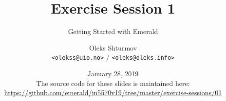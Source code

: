 \documentclass[xcolor=table]{beamer}
\title{{\Large Exercise Session 1}}
\subtitle{Getting Started with Emerald}
\institute{{\large University of Oslo}\\[0.2em] IN[59]570: Distributed Objects}
\author{Oleks Shturmov\\[-0.2em]%
  {\tiny \texttt{<olekss@uio.no>} / \texttt{<oleks@oleks.info>}}
}
\date{January 28, 2019\\[2em]
{\scriptsize The source code for these slides is maintained here: \\[-0.5em] {\tiny%
\url{https://github.com/emerald/in5570v19/tree/master/exercise-sessions/01}}%
}}
\begin{document}
\begin{frame} \titlepage \end{frame}


















\end{document}
